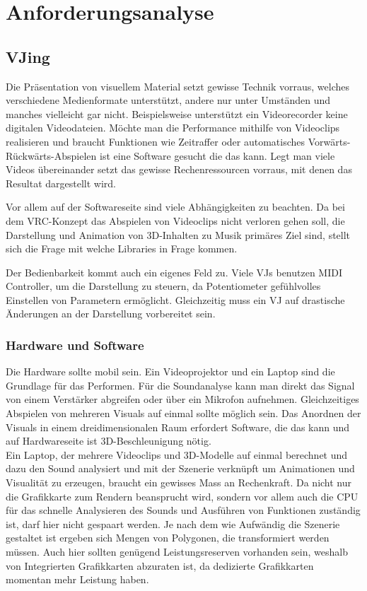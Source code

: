 \section{Anforderungsanalyse}


\subsection{VJing}

Die Pr\"asentation von visuellem Material setzt gewisse Technik vorraus, welches verschiedene Medienformate unterst\"utzt,
andere nur unter Umst\"anden und manches vielleicht gar nicht. Beispielsweise unterst\"utzt ein Videorecorder keine digitalen
Videodateien. M\"ochte man die Performance mithilfe von Videoclips realisieren und braucht Funktionen wie Zeitraffer oder
automatisches Vorw\"arts-R\"uckw\"arts-Abspielen ist eine Software gesucht die das kann. Legt man viele Videos \"ubereinander 
setzt das gewisse Rechenressourcen vorraus, mit denen das Resultat dargestellt wird.

Vor allem auf der Softwareseite sind viele Abh\"angigkeiten zu beachten. Da bei dem VRC-Konzept das Abspielen von Videoclips
nicht verloren gehen soll, die Darstellung und Animation von 3D-Inhalten zu Musik prim\"ares Ziel sind, stellt sich die Frage
mit welche Libraries in Frage kommen.

Der Bedienbarkeit kommt auch ein eigenes Feld zu. Viele VJs benutzen MIDI Controller, um die Darstellung zu steuern, da 
Potentiometer gef\"uhlvolles Einstellen von Parametern erm\"oglicht. Gleichzeitig muss ein VJ auf drastische \"Anderungen 
an der Darstellung vorbereitet sein.

\subsubsection{Hardware und Software}

Die Hardware sollte mobil sein. Ein Videoprojektor und ein Laptop sind die Grundlage f\"ur das Performen. F\"ur die 
Soundanalyse kann man direkt das Signal von einem Verst\"arker abgreifen oder \"uber ein Mikrofon aufnehmen. Gleichzeitiges 
Abspielen von mehreren Visuals auf einmal sollte m\"oglich sein. Das Anordnen der Visuals in einem dreidimensionalen
Raum erfordert Software, die das kann und auf Hardwareseite ist 3D-Beschleunigung n\"otig. 
\\
Ein Laptop, der mehrere Videoclips und 3D-Modelle auf einmal berechnet und dazu den Sound analysiert und mit der Szenerie
verkn\"upft um Animationen und Visualit\"at zu erzeugen, braucht ein gewisses Mass an Rechenkraft. Da nicht nur die 
Grafikkarte zum Rendern beansprucht wird, sondern vor allem auch die CPU f\"ur das schnelle Analysieren des Sounds und 
Ausf\"uhren von Funktionen zust\"andig ist, darf hier nicht gespaart werden. Je nach dem wie Aufw\"andig die Szenerie
gestaltet ist ergeben sich Mengen von Polygonen, die transformiert werden m\"ussen. Auch hier sollten gen\"ugend 
Leistungsreserven vorhanden sein, weshalb von Integrierten Grafikkarten abzuraten ist, da dedizierte Grafikkarten 
momentan mehr Leistung haben.

